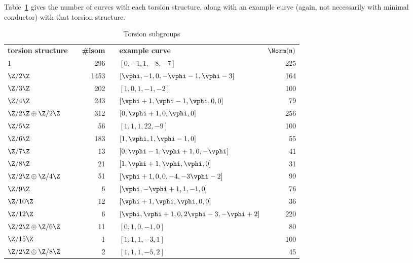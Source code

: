 \documentclass{amsart}
\newcommand{\n}{\mathfrak{n}}
\begin{document}
Table~\ref{table:torsion} gives the number of curves with each
torsion structure, along with an example curve (again, not necessarily with minimal conductor)
with that torsion structure.
\begin{center}
\begin{table}[h]
\caption{Torsion subgroups\label{table:torsion}}
\begin{tabular}{@{}lcrclr@{}}\toprule
\textbf{torsion structure} & \phantom{a} & \textbf{\#isom} & \phantom{a} & \textbf{example curve} & $\Norm(\n)$ \\\cmidrule{1-1}\cmidrule{3-3}\cmidrule{5-6}
1                    & & 296  & & $[0,-1,1,-8,-7]$                      & 225 \\
$\Z/2\Z$             & & 1453 & & $[\vphi,-1,0,-\vphi-1,\vphi-3]$       & 164 \\
$\Z/3\Z$             & & 202  & & $[1,0,1,-1,-2]$                       & 100 \\
$\Z/4\Z$             & & 243  & & $[\vphi+1,\vphi-1,\vphi,0,0]$         & 79  \\
$\Z/2\Z\oplus\Z/2\Z$ & & 312  & & $[0,\vphi+1,0,\vphi,0]$               & 256 \\
$\Z/5\Z$             & & 56   & & $[1,1,1,22,-9]$                       & 100 \\
$\Z/6\Z$             & & 183  & & $[1,\vphi,1,\vphi-1,0]$               & 55  \\
$\Z/7\Z$             & & 13   & & $[0,\vphi-1,\vphi+1,0,-\vphi]$        & 41  \\
$\Z/8\Z$             & & 21   & & $[1,\vphi+1,\vphi,\vphi,0]$           & 31  \\
$\Z/2\Z\oplus\Z/4\Z$ & & 51   & & $[\vphi+1,0,0,-4,-3\vphi-2]$          & 99  \\
$\Z/9\Z$             & & 6    & & $[\vphi,-\vphi+1,1,-1,0]$             & 76  \\
$\Z/10\Z$            & & 12   & & $[\vphi+1,\vphi,\vphi,0,0]$           & 36  \\
$\Z/12\Z$            & & 6    & & $[\vphi,\vphi+1,0,2\vphi-3,-\vphi+2]$ & 220 \\
$\Z/2\Z\oplus\Z/6\Z$ & & 11   & & $[0,1,0,-1,0]$                        & 80  \\
$\Z/15\Z$            & & 1    & & $[1,1,1,-3,1]$                        & 100 \\
$\Z/2\Z\oplus\Z/8\Z$ & & 2    & & $[1,1,1,-5,2]$                        & 45  \\\bottomrule
\end{tabular}
\end{table}
\end{center}
\end{document}
